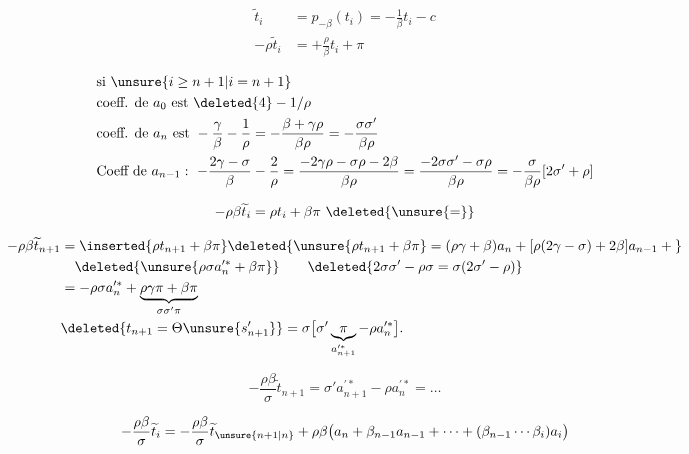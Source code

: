 \[
\begin{aligned}
\widetilde{t}_i&=p_{-\beta}(t_i)=-\frac1{\beta}t_i-c\\
-\rho\widetilde{t}_i&=+\frac{\rho}{\beta}t_i+\pi
\end{aligned}
\]

\[
\begin{aligned}
&\text{si }\unsure{i\ge n+1|i=n+1}\\
&\text{coeff. de }a_0\text{ est }\deleted{4}-1/\rho\\
&\text{coeff. de }a_n\text{ est }-\frac{\gamma}{\beta}-\frac1\rho
=-\frac{\beta+\gamma\rho}{\beta\rho}=-\frac{\sigma\sigma'}{\beta\rho}\\
&\text{Coeff de }a_{n-1}:\ -\frac{2\gamma-\sigma}{\beta}-\frac2\rho
=\frac{-2\gamma\rho-\sigma\rho-2\beta}{\beta\rho}
=\frac{-2\sigma\sigma'-\sigma\rho}{\beta\rho}
=-\frac{\sigma}{\beta\rho}[2\sigma'+\rho]
\end{aligned}
\]

\[
-\rho\beta\widetilde{t}_i=\rho t_i+\beta\pi\ \deleted{\unsure{=}}
\]

\[
\begin{aligned}
-\rho\beta\widetilde{t}_{n+1}
&=\inserted{\rho t_{n+1}+\beta\pi}
 \deleted{\unsure{\rho t_{n+1}+\beta\pi}=(\rho\gamma+\beta)a_n+
 [\rho(2\gamma-\sigma)+2\beta]a_{n-1}+{}}\\
&\quad\deleted{\unsure{\rho\sigma a_n^{\prime *}+\beta\pi}}
 \qquad\deleted{2\sigma\sigma'-\rho\sigma=\sigma(2\sigma'-\rho)}\\
&=-\rho\sigma a_n^{\prime *}+\underbrace{\rho\gamma\pi+\beta\pi}_{\sigma\sigma'\pi}\\
&\deleted{t_{n+1}=\Theta \unsure{s'_{n+1}}}
=\sigma\bigl[\sigma'\underbrace{\pi}_{a_{n+1}^{\prime *}}-\rho a_n^{\prime *}\bigr].
\end{aligned}
\]

\[
\boxed{-\frac{\rho\beta}{\sigma}\widetilde{t}_{n+1}
=\sigma'a_{n+1}^{\prime *}-\rho a_n^{\prime *}=\ldots}
\]

\[
-\frac{\rho\beta}{\sigma}\widetilde{t}_i
=-\frac{\rho\beta}{\sigma}\widetilde{t}_{\unsure{n+1|n}}+
 \rho\beta\bigl(a_n+\beta_{n-1}a_{n-1}+\cdots+
 (\beta_{n-1}\cdots\beta_i)a_i\bigr)
\]
